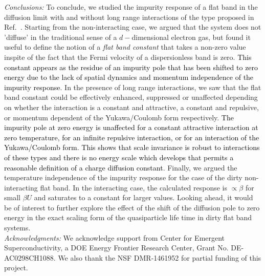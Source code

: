 \documentclass[prl,aps,twocolumn,groupaddress]{revtex4-1}
\begin{document}
\textit{Conclusions:} To conclude, we studied the impurity response of a flat band in the diffusion limit with and without long range interactions of the type proposed in Ref.~\cite{hk1992}. Starting from the non-interacting case, we argued that the system does not 'diffuse' in the traditional sense of a $d-$dimensional electron gas, but found it useful to define the notion of a \textit{flat band constant} that takes a non-zero value inspite of the fact that the Fermi velocity of a dispersionless band is zero. \textcolor{black}{This constant appears as the residue of an impurity pole that has been shifted to zero energy due to the lack of spatial dynamics and momentum independence of the impurity response}.  In the presence of long range interactions, we saw that the flat band constant could be effectively enhanced, suppressed or unaffected depending on whether the interaction is a constant and attractive, a constant and repulsive, or momentum dependent of the Yukawa/Coulomb form respectively.  \textcolor{black}{The impurity pole at zero energy is unaffected for a constant attractive interaction at zero temperature, for an infinite repulsive interaction, or for an interaction of the Yukawa/Coulomb form. This shows that scale invariance is robust to interactions of these types and there is no energy scale which develops that permits a reasonable definition of a charge diffusion constant}. Finally, we argued the temperature independence of the impurity response for the case of the dirty non-interacting flat band. In the interacting case, the calculated response is $\propto \beta$ for small $\beta U$ and saturates to a constant for larger values. Looking ahead, it would be of interest to further explore the effect of the shift of the diffusion pole to zero energy in the exact scaling form of the quasiparticle life time in dirty flat band systems.  \\ \newline
\textit{Acknowledgments:} We acknowledge support from Center for Emergent
Superconductivity, a DOE Energy Frontier Research Center, Grant No. DE-AC0298CH1088.  We also thank the NSF DMR-1461952 for partial funding of this project.

\onecolumngrid
\newpage
\end{document}
